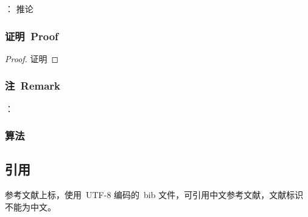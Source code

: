 \begin{corollary}： \label{co}
     推论
\end{corollary}


\subsubsection{证明~Proof}

\begin{proof}
    证明
\end{proof}


\subsubsection{注~Remark}

\begin{remark}：

\end{remark}

\subsubsection{算法}


\subsection{引用}

    参考文献上标\cite{friesz2011,DH2017}，使用~UTF-8 编码的~bib 文件，可引用中文参考文献，文献标识不能为中文。
